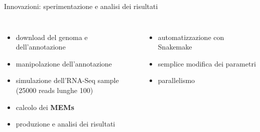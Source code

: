 \documentclass{beamer}
\begin{document}
\begin{tframe}{Innovazioni: sperimentazione e analisi dei risultati}
  \begin{columns}
    \begin{itemize}
      \item download del genoma e dell'annotazione
      \item manipolazione dell'annotazione
      \item simulazione dell'RNA-Seq sample\\
      \small{(25000 reads lunghe 100)}
      \item calcolo dei \textbf{MEMs}
      \item produzione e analisi dei risultati
    \end{itemize}
    \begin{itemize}
      \item automatizzazione con Snakemake
      \item semplice modifica dei parametri
      \item parallelismo
    \end{itemize}
  \end{columns}

    \begin{center}
\end{center}
\end{tframe}
\end{document}
